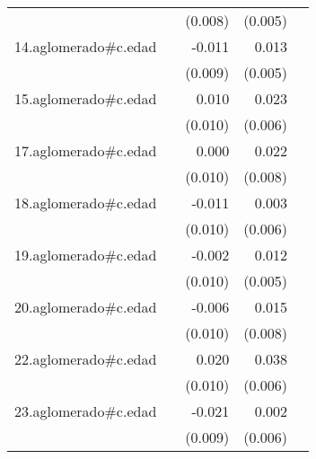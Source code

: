{\begin{longtable}{l*{4}{D{.}{.}{-1}}}
            &                     &     (0.008)         &     (0.005)         &                     \\
\addlinespace
14.aglomerado#c.edad&                     &      -0.011         &       0.013\sym{*}  &                     \\
            &                     &     (0.009)         &     (0.005)         &                     \\
\addlinespace
15.aglomerado#c.edad&                     &       0.010         &       0.023\sym{***}&                     \\
            &                     &     (0.010)         &     (0.006)         &                     \\
\addlinespace
17.aglomerado#c.edad&                     &       0.000         &       0.022\sym{**} &                     \\
            &                     &     (0.010)         &     (0.008)         &                     \\
\addlinespace
18.aglomerado#c.edad&                     &      -0.011         &       0.003         &                     \\
            &                     &     (0.010)         &     (0.006)         &                     \\
\addlinespace
19.aglomerado#c.edad&                     &      -0.002         &       0.012\sym{*}  &                     \\
            &                     &     (0.010)         &     (0.005)         &                     \\
\addlinespace
20.aglomerado#c.edad&                     &      -0.006         &       0.015         &                     \\
            &                     &     (0.010)         &     (0.008)         &                     \\
\addlinespace
22.aglomerado#c.edad&                     &       0.020\sym{*}  &       0.038\sym{***}&                     \\
            &                     &     (0.010)         &     (0.006)         &                     \\
\addlinespace
23.aglomerado#c.edad&                     &      -0.021\sym{*}  &       0.002         &                     \\
            &                     &     (0.009)         &     (0.006)         &                     \\

\end{longtable}}
